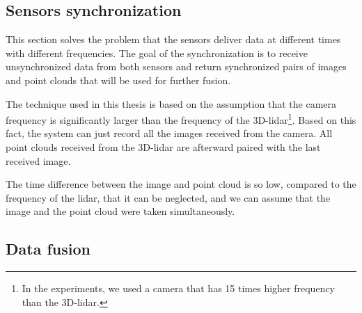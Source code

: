 \subsection{Sensors synchronization}

This section solves the problem that the sensors deliver data at different times with different frequencies. The goal of the synchronization is to receive unsynchronized data from both sensors and return synchronized pairs of images and point clouds that will be used for further fusion.\par
The technique used in this thesis is based on the assumption that the camera frequency is significantly larger than the frequency of the 3D-lidar\footnote{In the experiments, we used a camera that has 15 times higher frequency than the 3D-lidar.}. Based on this fact, the system can just record all the images received from the camera. All point clouds received from the 3D-lidar are afterward paired with the last received image.\par
The time difference between the image and point cloud is so low, compared to the frequency of the lidar, that it can be neglected, and we can assume that the image and the point cloud were taken simultaneously.

\subsection{Data fusion}


